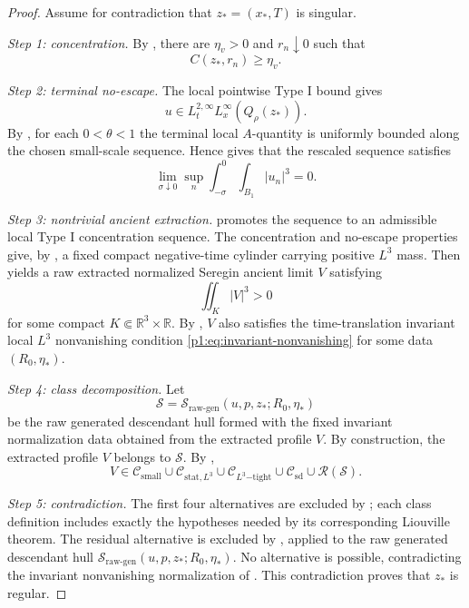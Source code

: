 \documentclass[11pt]{amsart}
\theoremstyle{plain}
\theoremstyle{definition}
\theoremstyle{remark}
\numberwithin{equation}{section}
\newcommand{\R}{\mathbb R}
\newcommand{\calS}{\mathcal S}
\newcommand{\calR}{\mathcal R}
\newcommand{\calC}{\mathcal C}
\begin{document}
\begin{proof}
Assume for contradiction that \(z_*=(x_*,T)\) is singular.

\emph{Step 1: concentration.}
By , there are \(\eta_v>0\) and
\(r_n\downarrow0\) such that
\[
   C(z_*,r_n)\ge\eta_v .
\]

\emph{Step 2: terminal no-escape.}
The local pointwise Type I bound gives
\[
   u\in L_t^{2,\infty}L_x^\infty(Q_\rho(z_*)).
\]
By , for each \(0<\theta<1\) the
terminal local \(A\)-quantity is uniformly bounded along the chosen
small-scale sequence.  Hence  gives that
the rescaled sequence satisfies
\[
   \lim_{\sigma\downarrow0}\sup_n
   \int_{-\sigma}^{0}\int_{B_1}|u_n|^3=0 .
\]

\emph{Step 3: nontrivial ancient extraction.}
 promotes the sequence to
an admissible local Type I concentration sequence.  The concentration and no-escape
properties give, by
, a fixed compact
negative-time cylinder carrying positive \(L^3\) mass.  Then
 yields a raw extracted normalized
Seregin ancient limit \(V\) satisfying
\[
   \iint_K |V|^3>0
\]
for some compact \(K\Subset\R^3\times\R\).  By
, \(V\) also satisfies the
time-translation invariant local \(L^3\) nonvanishing condition
\eqref{p1:eq:invariant-nonvanishing} for some data \((R_0,\eta_*)\).

\emph{Step 4: class decomposition.}
Let
\[
   \calS=\calS_{\mathrm{raw\text{-}gen}}(u,p,z_*;R_0,\eta_*)
\]
be the raw generated descendant hull formed with the fixed invariant
normalization data obtained from the extracted profile \(V\).  By construction, the
extracted profile \(V\) belongs to \(\calS\).  By ,
\[
   V\in
   \calC_{\mathrm{small}}
   \cup
   \calC_{\mathrm{stat},L^3}
   \cup
   \calC_{L^3\mathrm{-tight}}
   \cup
   \calC_{\mathrm{sd}}
   \cup
   \calR(\calS).
\]

\emph{Step 5: contradiction.}
The first four alternatives are excluded by
; each class definition includes exactly
the hypotheses needed by its corresponding Liouville theorem.  The residual
alternative is excluded by , applied to the raw
generated descendant hull
\(\calS_{\mathrm{raw\text{-}gen}}(u,p,z_*;R_0,\eta_*)\).  No alternative is possible, contradicting
the invariant nonvanishing normalization of .
This contradiction proves that \(z_*\) is regular.
\end{proof}
\end{document}

